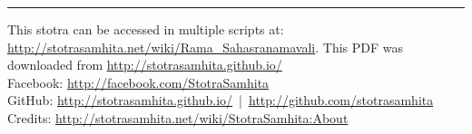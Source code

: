 \documentclass[twoside,12pt]{book}
\begin{document}
\setmainfont[Script=Devanagari,Mapping=tex-text]{Sanskrit 2003}
\fontsize {16}{19.25}\selectfont

\vfill
\hrule
\footnotesize
{}
\noindent\textsf{This stotra can be accessed in multiple scripts at:\\
\url{http://stotrasamhita.net/wiki/Rama_Sahasranamavali}. This PDF was downloaded from \url{http://stotrasamhita.github.io/}\\[1ex]
Facebook: \url{http://facebook.com/StotraSamhita}\\[0.7ex]
GitHub: \url{http://stotrasamhita.github.io/}~|~\url{http://github.com/stotrasamhita}\\[0.7ex]
Credits: \url{http://stotrasamhita.net/wiki/StotraSamhita:About}}
\end{document}
